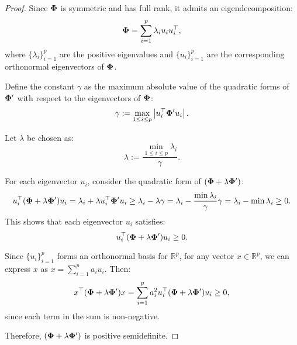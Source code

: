\begin{proof}
    Since $\boldsymbol{\Phi}$ is symmetric and has full rank, it admits an eigendecomposition:
    \[
        \boldsymbol{\Phi} = \sum_{i=1}^p \lambda_i u_i u_i^{\top},
    \]
    where $\{\lambda_i\}_{i=1}^p$ are the positive eigenvalues and $\{u_i\}_{i=1}^p$ are the corresponding orthonormal eigenvectors of $\boldsymbol{\Phi}$.

    Define the constant $\gamma$ as the maximum absolute value of the quadratic forms of $\boldsymbol{\Phi}'$ with respect to the eigenvectors of $\boldsymbol{\Phi}$:
    \[
        \gamma := \max_{1 \leq i \leq p} \left| u_i^{\top} \boldsymbol{\Phi}' u_i \right|.
    \]
    
    Let $\lambda$ be chosen as:
    \[
        \lambda := \frac{\min_{1 \leq i \leq p} \lambda_i}{\gamma}.
    \]
    
    For each eigenvector $u_i$, consider the quadratic form of $(\boldsymbol{\Phi} + \lambda \boldsymbol{\Phi}')$:
    \[
        u_i^{\top} (\boldsymbol{\Phi} + \lambda \boldsymbol{\Phi}') u_i = \lambda_i + \lambda u_i^{\top} \boldsymbol{\Phi}' u_i \geq \lambda_i - \lambda \gamma = \lambda_i - \frac{\min \lambda_i}{\gamma} \gamma = \lambda_i - \min \lambda_i \geq 0.
    \]
    This shows that each eigenvector $u_i$ satisfies:
    \[
        u_i^{\top} (\boldsymbol{\Phi} + \lambda \boldsymbol{\Phi}') u_i \geq 0.
    \]
    
    Since $\{u_i\}_{i=1}^p$ forms an orthonormal basis for $\mathbb{R}^p$, for any vector $x \in \mathbb{R}^p$, we can express $x$ as $x = \sum_{i=1}^p a_i u_i$. Then:
    \[
        x^{\top} (\boldsymbol{\Phi} + \lambda \boldsymbol{\Phi}') x = \sum_{i=1}^p a_i^2 u_i^{\top} (\boldsymbol{\Phi} + \lambda \boldsymbol{\Phi}') u_i \geq 0,
    \]
    since each term in the sum is non-negative.

    Therefore, $(\boldsymbol{\Phi} + \lambda \boldsymbol{\Phi}')$ is positive semidefinite.
\end{proof}


